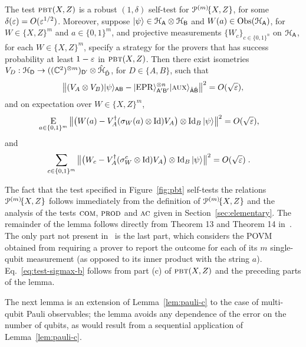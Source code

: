 \begin{lemma}\label{lem:pbt}
The test $\textsc{pbt}(X,Z)$ is a robust $(1,\delta)$ self-test 
for $\mathcal{P}^{(m)}\!\{X,Z\}$, for some $\delta(\varepsilon) = O(\varepsilon^{1/2})$. Moreover, suppose $|\psi\rangle\in\mathcal{H}_{\textsf{A}}\otimes \mathcal{H}_{\textsf{B}}$ and $W(a) \in \mathrm{Obs}(\mathcal{H}_{\textsf{A}})$, for $W\in \{X,Z\}^m$ and $a\in\{0,1\}^m$, and projective measurements $\{W_c\}_{c\in \{0,1\}^n}$ on $\mathcal{H}_{\textsf{A}}$, for each $W\in\{X,Z\}^m$, specify a strategy for the provers that has success probability at least $1-\varepsilon$ in $\textsc{pbt}(X,Z)$. 
Then there exist isometries $V_D:\mathcal{H}_{\textsf{D}} \to (({\mathbb C}^2)^{\otimes m})_{{\textsf{D'}}}  \otimes \hat{\mathcal{H}}_{\hat{{\textsf{D}}}}$, for $D\in\{A,B\}$, such that
$$\big\| (V_A \otimes V_B) |\psi\rangle_{{\textsf{AB}}} - |{\rm EPR}\rangle_{{\textsf{A}}'{\textsf{B}}'}^{\otimes n} |\textsc {aux}\rangle_{\hat{{\textsf{A}}}\hat{{\textsf{B}}}} \big\|^2 = O(\sqrt{\varepsilon}),$$
and on expectation over  $W\in \{X,Z\}^m$,
\begin{align}\label{eq:test-sigmax-a}
 \mathop{\textsc{E}}_{a\in\{0,1\}^m} \big\| \big(W(a) -V_A^\dagger (\sigma_W(a) \otimes \mathop{\rm Id}\nolimits) V_A\big) \otimes \mathop{\rm Id}\nolimits_B |\psi\rangle \big\|^2 &= O(\sqrt{\varepsilon}),
\end{align}
and
\begin{align}\label{eq:test-sigmax-b}
 \sum_{c\in\{0,1\}^m} \big\| \big(W_c -V_A^\dagger (\sigma_W^c \otimes \mathop{\rm Id}\nolimits) V_A\big) \otimes \mathop{\rm Id}\nolimits_B |\psi\rangle \big\|^2 &= O(\sqrt{\varepsilon})\;.
\end{align}
\end{lemma}

The fact that the test specified in Figure~\ref{fig:pbt} self-tests the relations $\mathcal{P}^{(m)}\!\{X,Z\}$ follows immediately from the definition of $\mathcal{P}^{(m)}\!\{X,Z\}$ and the analysis of the tests $\textsc{com}$, $\textsc{prod}$ and $\textsc{ac}$ given in Section~\ref{sec:elementary}. The remainder of the lemma follows directly from Theorem 13 and Theorem 14 in~\cite{natarajan2016robust}. The only part not present in~\cite{natarajan2016robust} is the last part, which considers the POVM obtained from requiring a prover to report the outcome for each of its $m$ single-qubit measurement (as opposed to its inner product with the string $a$). Eq.~\eqref{eq:test-sigmax-b} follows  from part (c) of $\textsc{pbt}(X,Z)$ and the preceding parts of the lemma. 

The next lemma is an extension of Lemma~\ref{lem:pauli-c} to the case of multi-qubit Pauli observables; the lemma avoids any dependence of the error on the number of qubits, as would result from a sequential application of Lemma~\ref{lem:pauli-c}.

